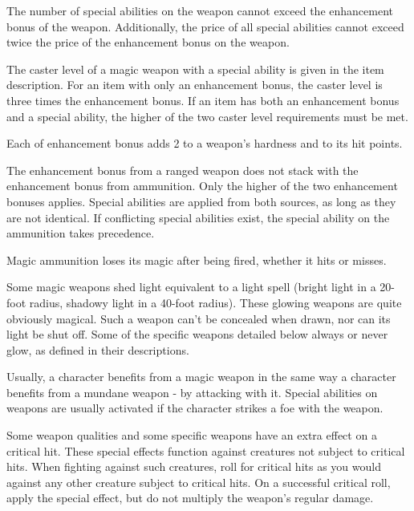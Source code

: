  The number of special abilities on the weapon cannot exceed the enhancement bonus of the weapon. Additionally, the price of all special abilities cannot exceed twice the price of the enhancement bonus on the weapon.

 The caster level of a magic weapon with a special ability is given in the item description. For an item with only an enhancement bonus, the caster level is three times the enhancement bonus. If an item has both an enhancement bonus and a special ability, the higher of the two caster level requirements must be met.

 Each  of enhancement bonus adds 2 to a weapon's hardness and  to its hit points.

 The enhancement bonus from a ranged weapon does not stack with the enhancement bonus from ammunition. Only the higher of the two enhancement bonuses applies. Special abilities are applied from both sources, as long as they are not identical. If conflicting special abilities exist, the special ability on the ammunition takes precedence.

Magic ammunition loses its magic after being fired, whether it hits or misses.

 Some magic weapons shed light equivalent to a light spell (bright light in a 20-foot radius, shadowy light in a 40-foot radius). These glowing weapons are quite obviously magical. Such a weapon can't be concealed when drawn, nor can its light be shut off. Some of the specific weapons detailed below always or never glow, as defined in their descriptions.

 Usually, a character benefits from a magic weapon in the same way a character benefits from a mundane weapon - by attacking with it. Special abilities on weapons are usually activated if the character strikes a foe with the weapon.

 Some weapon qualities and some specific weapons have an extra effect on a critical hit. These special effects function against creatures not subject to critical hits. When fighting against such creatures, roll for critical hits as you would against any other creature subject to critical hits. On a successful critical roll, apply the special effect, but do not multiply the weapon's regular damage.

